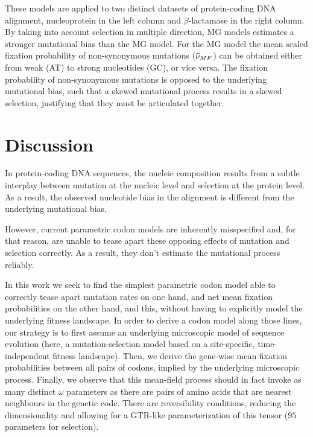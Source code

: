 \begin{table}[htbp]
{    These models are applied to two distinct datasets of protein-coding DNA alignment, nucleoprotein in the left column and $\beta$-lactamase in the right column.
    By taking into account selection in multiple direction, MG models estimates a stronger mutational bias than the MG model.
    For the MG model the mean scaled fixation probability of non-synonymous mutations ($\widehat{\nu}_{MF}$) can be obtained either from weak (AT) to strong nucleotides (GC), or vice versa.
    The fixation probability of non-synonymous mutations is opposed to the underlying mutational bias, such that a skewed mutational process results in a skewed selection, justifying that they must be articulated together.
    }
    \label{tab:mut-bias-estimation}
\end{table}


\section{Discussion}\label{sec:discussion}

In protein-coding DNA sequences, the nucleic composition results from a subtle interplay between mutation at the nucleic level and selection at the protein level.
As a result, the observed nucleotide bias in the alignment is different from the underlying mutational bias.

However, current parametric codon models are inherently misspecified and, for that reason, are unable to tease apart these opposing effects of mutation and selection correctly.
As a result, they don’t estimate the mutational process reliably.

In this work we seek to find the simplest parametric codon model able to correctly tease apart mutation rates on one hand, and net mean fixation probabilities on the other hand, and this, without having to explicitly model the underlying fitness landscape.
In order to derive a codon model along those lines, our strategy is to first assume an underlying microscopic model of sequence evolution (here, a mutation-selection model based on a site-specific, time-independent fitness landscape).
Then, we derive the gene-wise mean fixation probabilities between all pairs of codons, implied by the underlying microscopic process.
Finally, we observe that this mean-field process should in fact invoke as many distinct $\omega$ parameters as there are pairs of amino acids that are nearest neighbours in the genetic code.
There are reversibility conditions, reducing the dimensionality and allowing for a GTR-like parameterization of this tensor ($95$ parameters for selection).


